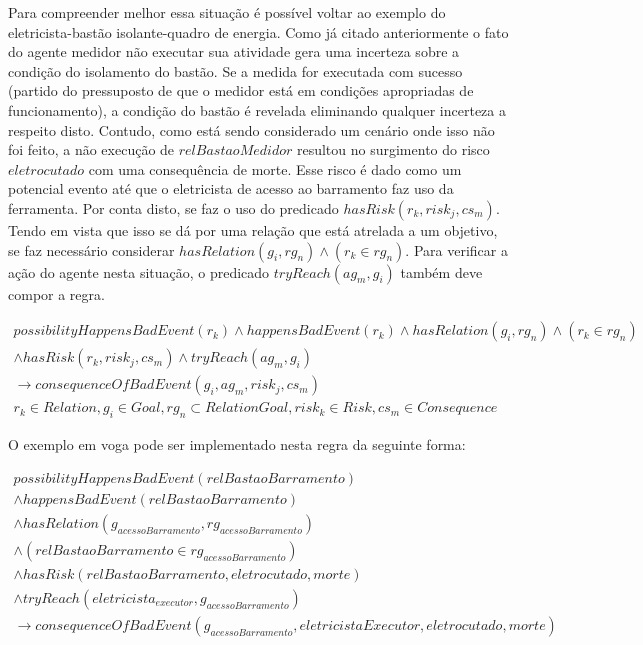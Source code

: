 Para compreender melhor essa situação é possível voltar ao exemplo do eletricista-bastão isolante-quadro de energia. Como já citado anteriormente o fato do agente medidor não executar sua atividade gera uma incerteza sobre a condição do isolamento do bastão. Se a medida for executada com sucesso (partido do pressuposto de que o medidor está em condições apropriadas de funcionamento), a condição do bastão é revelada eliminando qualquer incerteza a respeito disto. Contudo, como está sendo considerado um cenário onde isso não foi feito, a não execução de $relBastaoMedidor$ resultou no surgimento do risco $eletrocutado$ com uma consequência de morte. Esse risco é dado como um potencial evento até que o eletricista de acesso ao barramento faz uso da ferramenta. Por conta disto, se faz o uso do predicado $hasRisk(r_k,risk_j,cs_m)$. Tendo em vista que isso se dá por uma relação que está atrelada a um objetivo, se faz necessário considerar $hasRelation(g_i,rg_n) \wedge (r_k \in rg_n)$. Para verificar a ação do agente nesta situação, o predicado $tryReach(ag_m,g_i)$ também deve compor a regra.


\begin{eqnarray}\label{paybutiamnotguilty}
	possibilityHappensBadEvent(r_k) \wedge  happensBadEvent(r_k) \wedge hasRelation(g_i,rg_n) \wedge (r_k \in rg_n) \nonumber \\ 
	\wedge hasRisk(r_k,risk_j,cs_m) \wedge tryReach(ag_m,g_i) \nonumber \\ 
	\to consequenceOfBadEvent(g_i,ag_m,risk_j,cs_m) \nonumber \\ 
    r_k \in Relation, g_i \in Goal, rg_n \subset RelationGoal, risk_k \in Risk, cs_m \in Consequence
\end{eqnarray}

O exemplo em voga pode ser implementado nesta regra da seguinte forma: 


\begin{eqnarray}\nonumber
   possibilityHappensBadEvent(relBastaoBarramento) \nonumber \\
    \wedge happensBadEvent(relBastaoBarramento) \nonumber \\ 
    \wedge hasRelation(g_{acessoBarramento},rg_{acessoBarramento}) \nonumber \\  
    \wedge (relBastaoBarramento \in rg_{acessoBarramento}) \nonumber \\ 
    \wedge hasRisk(relBastaoBarramento,eletrocutado,morte) \nonumber \\  
    \wedge tryReach(eletricista_{executor},g_{acessoBarramento}) \nonumber \\ 
    \to consequenceOfBadEvent(g_{acessoBarramento},eletricistaExecutor,eletrocutado,morte) \\ \nonumber
\end{eqnarray}

